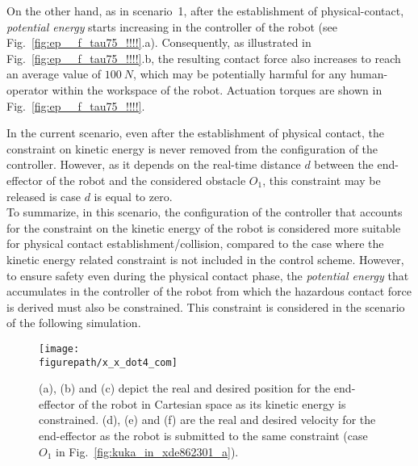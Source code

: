 On the other hand, as in scenario~1, after  the establishment of physical-contact, \textit{potential energy} starts increasing in the controller of the robot (see Fig.~\ref{fig:ep__f_tau75_!!!!}.a). Consequently, as illustrated in Fig.~\ref{fig:ep__f_tau75_!!!!}.b, the resulting contact force also increases to reach an average value of $100~N$, which may be potentially harmful for any human-operator within the workspace of the robot. Actuation torques are shown in Fig.~\ref{fig:ep__f_tau75_!!!!}.

In the current scenario, even after the establishment of physical contact, the constraint on kinetic energy is never removed from the configuration of the controller. However, as it depends on the real-time distance $d$ between the end-effector of the robot and the considered obstacle $O_1$, this constraint may be released is case $d$ is equal to zero. \\
To summarize, in this scenario, the configuration of the controller that accounts for the constraint on the kinetic energy of the robot is considered more suitable for physical contact establishment/collision, compared to the case where the kinetic energy related constraint is not included in the control scheme. However, to ensure safety even during the physical contact phase, the \textit{potential energy} that accumulates in the controller of the robot from which the hazardous contact force is derived must also be constrained. This constraint is considered in the scenario of the following simulation.
\begin{figure}[!htbp]
\centering
{\texttt{[image: \\figurepath/x\_x\_dot4\_com]}}
\caption{(a), (b) and (c) depict the real and desired position for the end-effector of the robot in Cartesian space as its kinetic energy is constrained. (d), (e) and (f) are the real and desired velocity for the end-effector as the robot is submitted to the same constraint (case $O_1$ in Fig.~\ref{fig:kuka_in_xde862301_a}).} 
\label{fig:x_x_dot4_com}
\end{figure}
